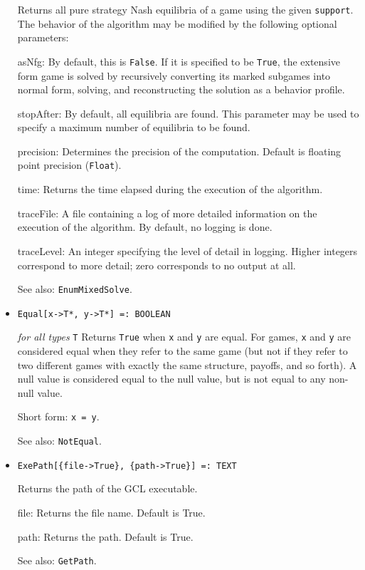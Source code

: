 \begin{itemize}
\bd
Returns all pure strategy Nash equilibria of a game using the given
\verb+support+.  The behavior
of the algorithm may be modified by the following optional parameters:
\bd
\item
[asNfg:] By default, this is \verb+False+.  If it is specified to be
\verb+True+, the extensive form game is solved by recursively converting
its marked subgames into normal form, solving, and reconstructing the
solution as a behavior profile.
\item
[stopAfter:] By default, all equilibria are found.  This parameter may
be used to specify a maximum number of equilibria to be found.
\item
[precision:] Determines the precision of the computation. Default is
floating point precision (\verb+Float+). 
\item
[time:] Returns the time elapsed during the execution
of the algorithm.
\item
[traceFile:] A file containing a log of more detailed information on the
execution of the algorithm.  By default, no logging is done.
\item
[traceLevel:] An integer specifying the level of detail in logging.  Higher
integers correspond to more detail; zero corresponds to no output at all.
\ed
\item
[See also:] \verb+EnumMixedSolve+.
\ed

\item{}
\protect \large \begin{verbatim}
Equal[x->T*, y->T*] =: BOOLEAN
\end{verbatim}\normalsize

{\it for all types} {\tt T}
\bd
Returns \verb+True+ when \verb+x+ and \verb+y+ are equal.  For games,
\verb+x+ and \verb+y+ are considered equal when they refer to the same
game (but not if they refer to two different games with exactly the
same structure, payoffs, and so forth).  A null value is considered equal
to the null value, but is not equal to any non-null value.
\item
[Short form:] \verb+x = y+.
\item
[See also:] \verb+NotEqual+.
\ed

\item{}
\protect \large \begin{verbatim}
ExePath[{file->True}, {path->True}] =: TEXT 
\end{verbatim} \normalsize

\bd
Returns the path of the GCL executable. 
\bd
\item [file:] Returns the file name.  Default is True.  
\item [path:] Returns the path.  Default is True. 
\ed
\item [See also:] \verb+GetPath+.
\ed


\end{itemize}
